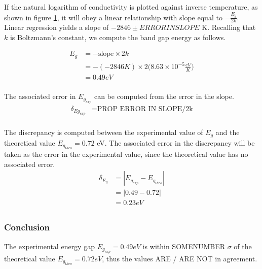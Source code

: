 \documentclass[a4paper]{article}
\begin{document}
\begin{figure}[H]
\centering
\label{task23plotLINEAR}
\end{figure}

If the natural logarithm of conductivity is plotted against inverse temperature, as shown in figure \ref{task23plotLINEAR}, it will obey 
a linear relationship with slope equal to $- \frac{E_g}{2k}$. Linear regression yields a slope of $-2846 \pm ERRORINSLOPE$ K. Recalling that $k$ is Boltzmann's constant, we compute the band gap energy as follows.

\begin{align*}
E_g &= - \text{slope} \times 2k \\
    &= - (-2846 K) \times 2 
       \Big( 8.63 \times 10^{-5} \frac{eV}{K} \Big) \\
    &= 0.49 eV \\
\end{align*}

The associated error in $E_{g_{exp}}$ can be computed from the error in the slope.
\begin{align*}
\delta_{Eg_{exp}} &= \text{PROP ERROR IN SLOPE/2k} \\
\end{align*}

The discrepancy is computed between the experimental value of $E_g$ and the theoretical value $E_{g_{theo}} = 0.72$ eV. The associated error in the discrepancy will be taken as the error in the experimental value, since the theoretical value has no associated error.
\begin{align*}
\delta_{E_g} &= | E_{g_{exp}} - E_{g_{theo}} | \\
		     &= | 0.49 - 0.72 | \\
		     &= 0.23 eV \\
\end{align*}

\subsubsection{Conclusion}
The experimental energy gap $E_{g_{exp}} = 0.49 eV$ is within SOMENUMBER $\sigma$ of the theoretical value $E_{g_{theo}} = 0.72 eV$, thus the values  ARE / ARE NOT in agreement.
\end{document}
